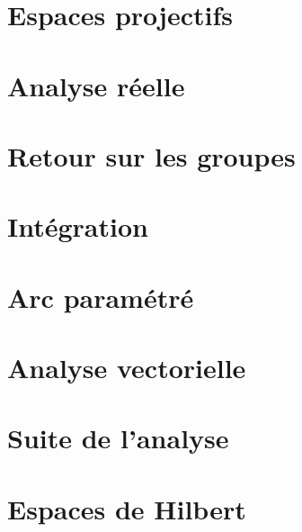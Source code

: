 \chapter{Espaces projectifs}


\chapter{Analyse réelle}









\chapter{Retour sur les groupes}






\chapter{Intégration}








\chapter{Arc paramétré}



\chapter{Analyse vectorielle}


\chapter{Suite de l'analyse}







\chapter{Espaces de Hilbert}


